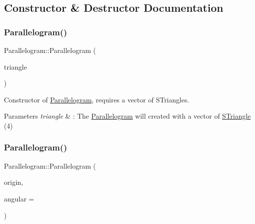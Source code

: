 \subsection{Constructor \& Destructor Documentation}
\mbox{\label{classParallelogram_ac028ca113b67af9295c474a93bc13b86}} 
\subsubsection{\texorpdfstring{Parallelogram()}{Parallelogram()}\hspace{0.1cm}{\footnotesize\ttfamily [1/2]}}
{\footnotesize\ttfamily Parallelogram\+::\+Parallelogram (\begin{DoxyParamCaption}\item[{const std\+::vector$<$ \hyperlink{classSTriangle}{S\+Triangle} $>$ \&}]{triangle }\end{DoxyParamCaption})\hspace{0.3cm}{\ttfamily [explicit]}}



Constructor of \hyperlink{classParallelogram}{Parallelogram}, requires a vector of S\+Triangles. 


\begin{DoxyParams}{Parameters}
{\em triangle} & \+: The \hyperlink{classParallelogram}{Parallelogram} will created with a vector of \hyperlink{classSTriangle}{S\+Triangle} (4) \\
\hline
\end{DoxyParams}
\mbox{\label{classParallelogram_afe4d20e613d01f409788d1875afcd8a8}} 
\subsubsection{\texorpdfstring{Parallelogram()}{Parallelogram()}\hspace{0.1cm}{\footnotesize\ttfamily [2/2]}}
{\footnotesize\ttfamily Parallelogram\+::\+Parallelogram (\begin{DoxyParamCaption}\item[{\hyperlink{classPoint}{Point}$<$ double $>$}]{origin,  }\item[{double}]{angular = {} }\end{DoxyParamCaption})\hspace{0.3cm}{\ttfamily [explicit]}}




